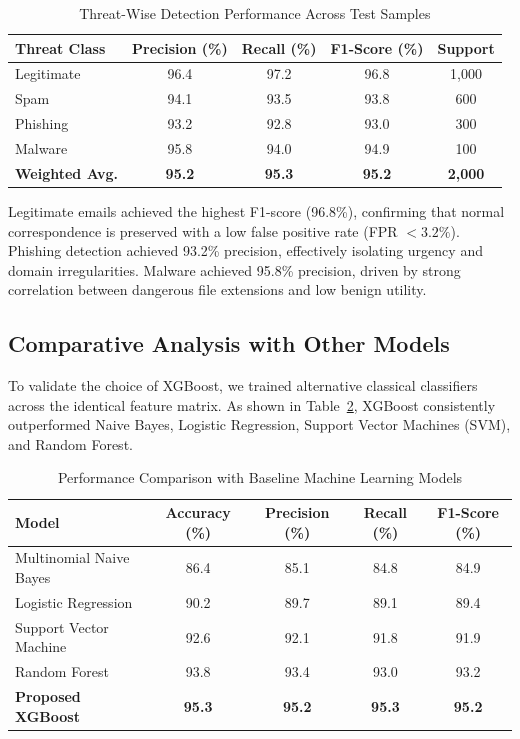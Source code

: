 \documentclass[conference]{IEEEtran}
\begin{document}
\begin{table}[htbp]
\caption{Threat-Wise Detection Performance Across Test Samples}
\label{tab:threat_performance}
\centering
\begin{tabular}{lcccc}
\toprule
\textbf{Threat Class} & \textbf{Precision (\%)} & \textbf{Recall (\%)} & \textbf{F1-Score (\%)} & \textbf{Support} \\
\midrule
Legitimate & 96.4 & 97.2 & 96.8 & 1,000 \\
Spam       & 94.1 & 93.5 & 93.8 & 600 \\
Phishing   & 93.2 & 92.8 & 93.0 & 300 \\
Malware    & 95.8 & 94.0 & 94.9 & 100 \\
\midrule
\textbf{Weighted Avg.} & \textbf{95.2} & \textbf{95.3} & \textbf{95.2} & \textbf{2,000} \\
\bottomrule
\end{tabular}
\end{table}

Legitimate emails achieved the highest F1-score (96.8\%), confirming that normal correspondence is preserved with a low false positive rate (FPR $< 3.2\%$). Phishing detection achieved 93.2\% precision, effectively isolating urgency and domain irregularities. Malware achieved 95.8\% precision, driven by strong correlation between dangerous file extensions and low benign utility.

\subsection{Comparative Analysis with Other Models}
To validate the choice of XGBoost, we trained alternative classical classifiers across the identical feature matrix. As shown in Table~\ref{tab:model_comparison}, XGBoost consistently outperformed Naive Bayes, Logistic Regression, Support Vector Machines (SVM), and Random Forest.

\begin{table}[htbp]
\caption{Performance Comparison with Baseline Machine Learning Models}
\label{tab:model_comparison}
\centering
\begin{tabular}{lcccc}
\toprule
\textbf{Model} & \textbf{Accuracy (\%)} & \textbf{Precision (\%)} & \textbf{Recall (\%)} & \textbf{F1-Score (\%)} \\
\midrule
Multinomial Naive Bayes & 86.4 & 85.1 & 84.8 & 84.9 \\
Logistic Regression     & 90.2 & 89.7 & 89.1 & 89.4 \\
Support Vector Machine  & 92.6 & 92.1 & 91.8 & 91.9 \\
Random Forest           & 93.8 & 93.4 & 93.0 & 93.2 \\
\textbf{Proposed XGBoost} & \textbf{95.3} & \textbf{95.2} & \textbf{95.3} & \textbf{95.2} \\
\bottomrule
\end{tabular}
\end{table}
\end{document}
